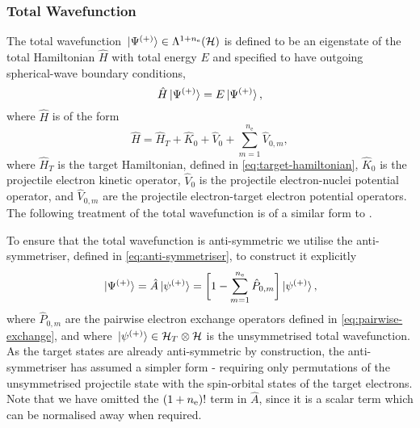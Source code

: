 \documentclass[]{article}
\begin{document}
\subsubsection{Total Wavefunction}
\label{sec:th-ccc-total}

The total wavefunction
$\ket*{\Psi^{(+)}} \in \Lambda^{1 + n_{\mathrm{e}}}(\mathcal{H})$ is
defined to be an eigenstate of the total Hamiltonian $\hat{H}$ with total
energy $E$ and specified to have outgoing spherical-wave boundary conditions,
\begin{equation}
  \label{eq:total-wavefunction}
  \hat{H}
  \ket*{\Psi^{\lr{+}}}
  =
  E
  \ket*{\Psi^{\lr{+}}}
  ,
\end{equation}
where $\hat{H}$ is of the form
\begin{equation}
  \label{eq:total-hamiltonian}
  \hat{H}
  =
  \hat{H}_{T}
  +
  \hat{K}_{0}
  +
  \hat{V}_{0}
  +
  \sum_{m = 1}^{n_{\mathrm{e}}}
  \hat{V}_{0, m}
  ,
\end{equation}
where $\hat{H}_{T}$ is the target Hamiltonian, defined in
\eqref{eq:target-hamiltonian}, $\hat{K}_{0}$ is the projectile electron
kinetic operator, $\hat{V}_{0}$ is the projectile electron-nuclei potential
operator, and $\hat{V}_{0, m}$ are the projectile electron-target electron
potential operators.
The following treatment of the total wavefunction is of a similar form to
\cite[202-204]{AJP_BRAY1996}.

To ensure that the total wavefunction is anti-symmetric we utilise the
anti-symmetriser, defined in \eqref{eq:anti-symmetriser}, to construct it
explicitly
\begin{equation}
  \label{eq:total-wavefunction-antisymmetrisation}
  \ket*{\Psi^{\lr{+}}}
  =
  \hat{A}
  \ket*{\psi^{\lr{+}}}
  =
  \lrsq[\bigg]
  {
    1
    -
    \sum_{m = 1}^{n_{\mathrm{e}}}
    \hat{P}_{0, m}
  }
  \ket*{\psi^{\lr{+}}}
  ,
\end{equation}
where $\hat{P}_{0, m}$ are the pairwise electron exchange operators defined in
\eqref{eq:pairwise-exchange}, and where
$\ket*{\psi^{(+)}} \in \mathcal{H}_{T} \otimes \mathcal{H}$ is the
unsymmetrised total wavefunction.
As the target states are already anti-symmetric by construction, the
anti-symmetriser has assumed a simpler form - requiring only permutations
of the unsymmetrised projectile state with the spin-orbital states of the
target electrons.
Note that we have omitted the $(1 + n_{\mathrm{e}})!$ term in $\hat{A}$,
since it is a scalar term which can be normalised away when required.
\end{document}
